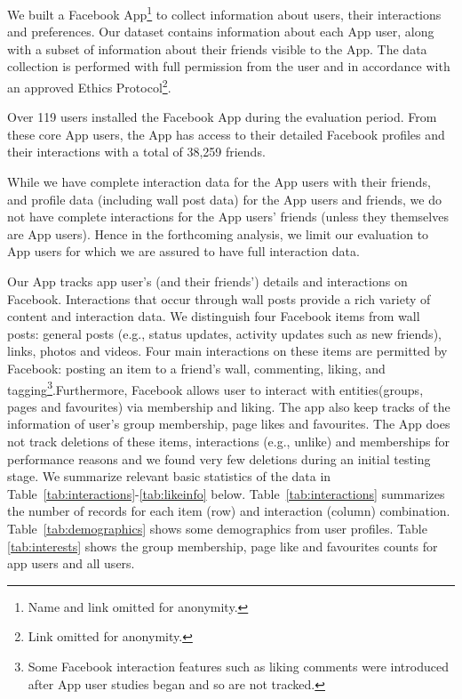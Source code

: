 
We built a Facebook App\footnote{Name and link omitted
for anonymity.} to collect information about users, 
their interactions and preferences.  
Our dataset contains information about each App user, along with a
subset of information about their friends visible to the App.  The
data collection is performed with full permission from the user and in
accordance with an approved Ethics Protocol\footnote{Link omitted for
anonymity.}.

Over 119 users installed the Facebook App during the
evaluation period. From these core App users, the App has access to their
detailed Facebook profiles and their interactions with a total of
38,259 friends.

While we have complete interaction data for the App
users with their friends, and profile data (including
wall post data) for the App users and friends, we do not have complete
interactions for the App users' friends (unless they themselves are
App users).  Hence in the forthcoming analysis, we limit our
evaluation to App users for which we are assured to have full
interaction data.

Our App tracks app user's (and their friends') details and interactions
on Facebook.  Interactions that occur through wall posts provide a
rich variety of content and interaction data.  We distinguish four
Facebook items from wall posts: general posts (e.g., status updates,
activity updates such as new friends), links, photos and videos. Four main
interactions on these items are permitted by Facebook: posting an item
to a friend's wall, commenting, liking, and tagging\footnote{Some
Facebook interaction features such as liking comments were introduced
after App user studies began and so are not tracked.}.Furthermore, Facebook allows user to interact with
entities(groups, pages and favourites) via membership and liking. The app also keep tracks of the information 
of user's group membership, page likes and favourites.
The App does not track deletions of these items, interactions (e.g., unlike) and memberships for
performance reasons and we found very few deletions during an initial
testing stage.
We summarize relevant basic statistics of the data in Table~\ref{tab:interactions}-\ref{tab:likeinfo} below.
Table~\ref{tab:interactions}
summarizes the number of records for each item (row) and interaction (column)
combination. Table~\ref{tab:demographics} shows 
some demographics from user profiles. Table \ref{tab:interests} shows the group membership, page like and favourites counts for app users and  all users.

